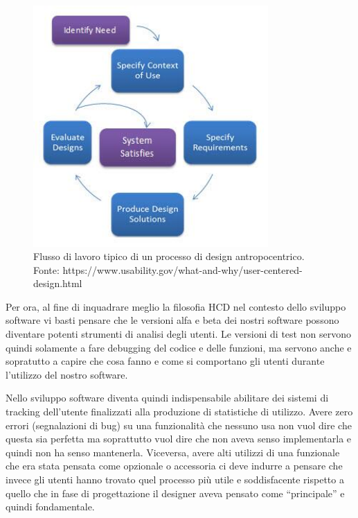 \begin{figure}[!h]
	\centering
	\includegraphics[width=0.8\textwidth]{immagini/HCD-chart}
	\caption{Flusso di lavoro tipico di un processo di design antropocentrico. Fonte: https://www.usability.gov/what-and-why/user-centered-design.html}
	\label{hcd-chart}
\end{figure}

Per ora, al fine di inquadrare meglio la filosofia HCD nel contesto dello sviluppo software vi basti pensare che le versioni alfa e beta dei nostri software possono diventare potenti strumenti di analisi degli utenti. Le versioni di test non servono quindi solamente a fare debugging del codice e delle funzioni, ma servono anche e sopratutto a capire che cosa fanno e come si comportano gli utenti durante l'utilizzo del nostro software.

Nello sviluppo software diventa quindi indispensabile abilitare dei sistemi di tracking dell'utente finalizzati alla produzione di statistiche di utilizzo. Avere zero errori (segnalazioni di bug) su una funzionalità che nessuno usa non vuol dire che questa sia perfetta ma soprattutto vuol dire che non aveva senso implementarla e quindi non ha senso mantenerla. Viceversa, avere alti utilizzi di una funzionale che era stata pensata come opzionale o accessoria ci deve indurre a pensare che invece gli utenti hanno trovato quel processo più utile e soddisfacente rispetto a quello che in fase di progettazione il designer aveva pensato come ``principale'' e quindi fondamentale.


